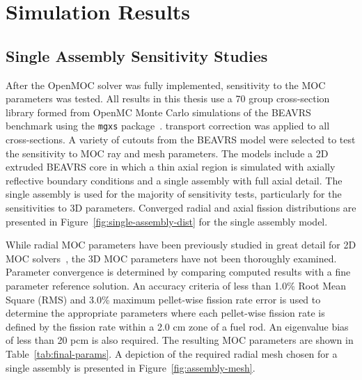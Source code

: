 \documentclass[12pt,twoside]{mitthesis-exec}
\begin{document}
\section*{Simulation Results}

\subsection*{Single Assembly Sensitivity Studies}

After the OpenMOC solver was fully implemented, sensitivity to the MOC parameters was tested. All results in this thesis use a 70 group cross-section library formed from OpenMC Monte Carlo simulations of the BEAVRS benchmark using the \texttt{mgxs} package~\cite{boyd2017thesis}.  transport correction was applied to all cross-sections. A variety of cutouts from the BEAVRS model were selected to test the sensitivity to MOC ray and mesh parameters. The models include a 2D extruded BEAVRS core in which a thin axial region is simulated with axially reflective boundary conditions and a single assembly with full axial detail. The single assembly is used for the majority of sensitivity tests, particularly for the sensitivities to 3D parameters. Converged radial and axial fission distributions are presented in Figure~\ref{fig:single-assembly-dist} for the single assembly model.

While radial MOC parameters have been previously studied in great detail for 2D MOC solvers~\cite{rhodes2006casmo}, the 3D MOC parameters have not been thoroughly examined. Parameter convergence is determined by comparing computed results with a fine parameter reference solution. An accuracy criteria of less than 1.0\% Root Mean Square (RMS) and 3.0\% maximum pellet-wise fission rate error is used to determine the appropriate parameters where each pellet-wise fission rate is defined by the fission rate within a 2.0 cm zone of a fuel rod. An eigenvalue bias of less than 20 pcm is also required. The resulting MOC parameters are shown in Table~\ref{tab:final-params}. A depiction of the required radial mesh chosen for a single assembly is presented in Figure~\ref{fig:assembly-mesh}.
\end{document}
